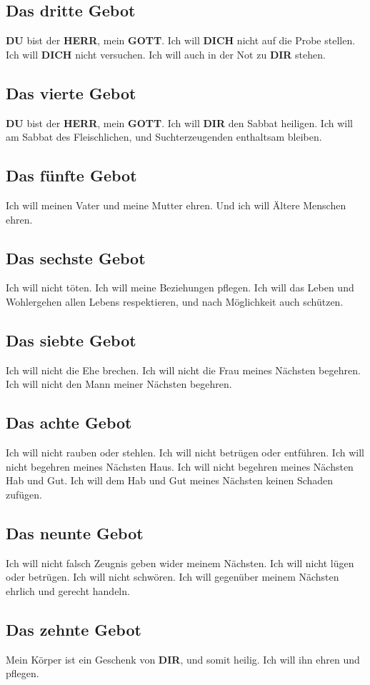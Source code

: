 \documentclass[12pt,a4paper]{article}
\newcommand{\Dich}[0]{\textbf{DICH}}
\newcommand{\Dir}[0]{\textbf{DIR}}
\newcommand{\Du}[0]{\textbf{DU}}
\newcommand{\Gott}[0]{\textbf{GOTT}}
\newcommand{\Herr}[0]{\textbf{HERR}}
\begin{document}
	\subsection{Das dritte Gebot}
	{\Du} bist der {\Herr},
	mein {\Gott}.
	Ich will {\Dich} nicht auf die Probe stellen.
	Ich will {\Dich} nicht versuchen.
	Ich will auch in der Not zu {\Dir} stehen.
	
	\subsection{Das vierte Gebot}
	{\Du} bist der {\Herr},
	mein {\Gott}.
	Ich will {\Dir} den Sabbat heiligen.
	Ich will am Sabbat des Fleischlichen,
	und Suchterzeugenden enthaltsam bleiben.
	
	\subsection{Das f\"unfte Gebot}
	Ich will meinen Vater und meine Mutter ehren.
	Und ich will \"Altere Menschen ehren.
		
	\subsection{Das sechste Gebot}
	Ich will nicht t\"oten.
	Ich will meine Beziehungen pflegen.
	Ich will das Leben und Wohlergehen allen Lebens respektieren,
	und nach M\"oglichkeit auch sch\"utzen.
	
	\subsection{Das siebte Gebot}
	Ich will nicht die Ehe brechen.
	Ich will nicht die Frau meines N\"achsten begehren.
	Ich will nicht den Mann meiner N\"achsten begehren.
	
	\subsection{Das achte Gebot}
	Ich will nicht rauben oder stehlen.
	Ich will nicht betr\"ugen oder entf\"uhren.
	Ich will nicht begehren meines N\"achsten Haus.
	Ich will nicht begehren meines N\"achsten Hab und Gut.
	Ich will dem Hab und Gut meines N\"achsten keinen Schaden zuf\"ugen.
	
	\subsection{Das neunte Gebot}
	Ich will nicht falsch Zeugnis geben wider meinem N\"achsten.
	Ich will nicht l\"ugen oder betr\"ugen.
	Ich will nicht schw\"oren.
	Ich will gegen\"uber meinem N\"achsten ehrlich und gerecht handeln.
	
	\subsection{Das zehnte Gebot}
	Mein K\"orper ist ein Geschenk von {\Dir},
	und somit heilig.
	Ich will ihn ehren und pflegen.
	
\end{document}
